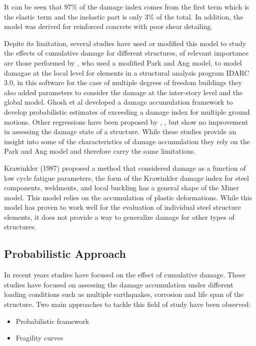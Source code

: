 It can be seen that 97\% of the damage index comes from the first term which is the elastic term and the inelastic part is only 3\% of the total. In addition, the model was derived for reinforced concrete with poor shear detailing. 

Depite its limitation, several studies have used or modified this model to study the effects of cumulative damage for different structures,  of relevant importance are those performed by \cite{Kunnath1992}, who used a modified Park and Ang model, to model damagae at the local level for elements in a structural analysis program IDARC 3.0, in this software for the case of multiple degrees of freedom buildings they also added parameters to consider the damage at the inter-story level and the global model. Ghosh et al \cite{Ghosh2015} developed a damage accumulation framework to develop probabilistic estimates of exceeding a damage index for multiple ground motions. Other regressions have been proposed by \cite{Khashaee}, \cite{Fajfar1992}, \cite{Roufaiel} but show no improvement in assessing the damage state of a structure. While these studies provide an insight into some of the characteristics of damage accumulation they rely on the Park and Ang model and therefore carry the same limitations.

Krawinkler (1987) \cite{Krawinkler1987} proposed a method that considered damage as a function of low cycle fatigue parameters, the form of the Krawinkler damage index for steel components, weldments, and local buckling has a general shape of the Miner model. This model relies on the accumulation of plastic deformations. While this model has proven to work well for the evaluation of individual steel structure elements, it does not provide a way to generalize damage for other types of structures.

\subsection{Probabilistic Approach}

In recent years studies have focused on the effect of cumulative damage. These studies have focused on assessing the damage accumulation under different loading conditions such as multiple earthquakes, corrosion and life span of the structure. Two main approaches to tackle this field of study have been observed:

\begin{itemize}
	\item Probabilistic framework
	\item Fragility curves
\end{itemize}

